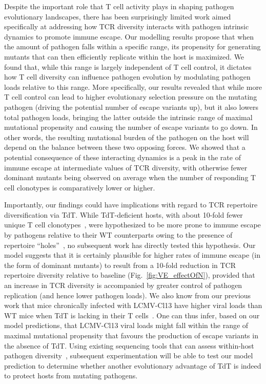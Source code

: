 Despite the important role that T cell activity plays in shaping pathogen evolutionary landscapes, there has been surprisingly limited work aimed specifically at addressing how TCR diversity interacts with pathogen intrinsic dynamics to promote immune escape. Our modelling results propose that when the amount of pathogen falls within a specific range, its propensity for generating mutants that can then efficiently replicate within the host is maximized. We found that, while this range is largely independent of T cell control, it dictates how T cell diversity can influence pathogen evolution by modulating pathogen loads relative to this range. More specifically, our results revealed that while more T cell control can lead to higher evolutionary selection pressure on the mutating pathogen (driving the potential number of escape variants up), but it also lowers total pathogen loads, bringing the latter outside the intrinsic range of maximal mutational propensity and causing the number of escape variants to go down. In other words, the resulting mutational burden of the pathogen on the host will depend on the balance between these two opposing forces. We showed that a potential consequence of these interacting dynamics is a peak in the rate of immune escape at intermediate values of TCR diversity, with otherwise fewer dominant mutants being observed on average when the number of responding T cell clonotypes is comparatively lower or higher.

Importantly, our findings could have implications with regard to TCR repertoire diversification via TdT. While TdT-deficient hosts, with about 10-fold fewer unique T cell clonotypes~\cite{davis1988t,murugan2012statistical,zarnitsyna2013estimating}, were hypothesized to be more prone to immune escape by pathogens relative to their WT counterparts owing to the presence of repertoire ``holes''~\cite{vrisekoop2014revisiting}, no subsequent work has directly tested this hypothesis. Our model suggests that it is certainly plausible for higher rates of immune escape (in the form of dominant mutants) %
to result from a 10-fold reduction in TCR repertoire diversity relative to baseline (Fig.~\ref{fig:VE_effectOfN}), provided that an increase in TCR diversity is accompanied by greater control of pathogen replication (and hence lower pathogen loads). We also know from our previous work that mice chronically infected with LCMV-Cl13 have higher viral loads than WT mice when TdT is lacking in their T cells~\cite{jamaleddine2022chronic}. One can thus infer, based on our model predictions, that LCMV-Cl13 viral loads might fall within the range of maximal mutational propensity that favours the production of escape variants in the absence of TdT. Using existing sequencing tools that can assess within-host pathogen diversity~\cite{lauring2020within}, subsequent experimentation will be able to test our model prediction to determine whether another evolutionary advantage of TdT is indeed to protect hosts from mutating pathogens.

